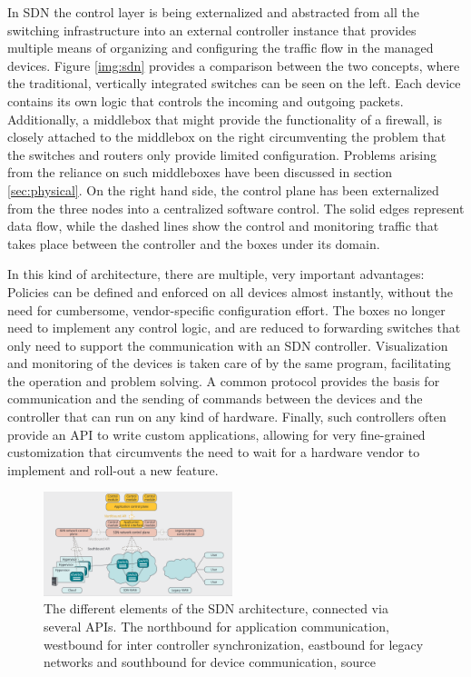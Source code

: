 In SDN the control layer is being externalized and abstracted from all the switching infrastructure into an external controller instance that provides multiple means of organizing and configuring the traffic flow in the managed devices. Figure \ref{img:sdn} provides a comparison between the two concepts, where the traditional, vertically integrated switches can be seen on the left. Each device contains its own logic that controls the incoming and outgoing packets. Additionally, a middlebox that might provide the functionality of a firewall, is closely attached to the middlebox on the right circumventing the problem that the switches and routers only provide limited configuration. Problems arising from the reliance on such middleboxes have been discussed in section \ref{sec:physical}.  On the right hand side, the control plane has been externalized from the three nodes into a centralized software control. The solid edges represent data flow, while the dashed lines show the control and monitoring traffic that takes place between the controller and the boxes under its domain.

In this kind of architecture, there are multiple, very important advantages: Policies can be defined and enforced on all devices almost instantly, without the need for cumbersome, vendor-specific configuration effort. The boxes no longer need to implement any control logic, and are reduced to forwarding switches that only need to support the communication with an SDN controller. Visualization and monitoring of the devices is taken care of by the same program, facilitating the operation and problem solving. A common protocol provides the basis for communication and the sending of commands between the devices and the controller that can run on any kind of hardware. Finally, such controllers often provide an API to write custom applications, allowing for very fine-grained customization that circumvents the need to wait for a hardware vendor to implement and roll-out a new feature.  

\begin{figure}[H]
	\centering
	\includegraphics[width=0.49\textwidth]{images/sdnAPIs.png}
	\caption{The different elements of the SDN architecture, connected via several APIs. The northbound for application communication, westbound for inter controller synchronization, eastbound for legacy networks and southbound for device communication, source \cite{jarschel2014interfaces}}
	\label{img:sdnAPIs}
\end{figure}


